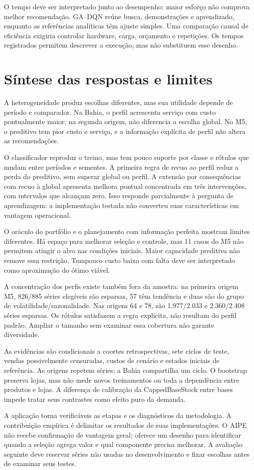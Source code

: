 O tempo deve ser interpretado junto ao desempenho: maior esforço não comprova melhor recomendação. GA--DQN reúne busca, demonstrações e aprendizado, enquanto as referências analíticas têm ajuste simples. Uma comparação causal de eficiência exigiria controlar hardware, carga, orçamento e repetições. Os tempos registrados permitem descrever a execução, mas não substituem esse desenho.


\section{Síntese das respostas e limites}
\label{sec:threats}\label{sec:resultados_m5}
A heterogeneidade produz escolhas diferentes, mas sua utilidade depende de período e comparador. Na Bahia, o perfil acrescenta serviço com custo pontualmente maior; na segunda origem, não diferencia a escolha global. No M5, o preditivo tem pior custo e serviço, e a informação explícita de perfil não altera as recomendações.

O classificador reproduz o treino, mas tem pouco suporte por classe e rótulos que mudam entre períodos e sementes. A primeira regra de recuo ao perfil reduz a perda do preditivo, sem superar global ou perfil. A extensão por consequências com recuo à global apresenta melhora pontual concentrada em três intervenções, com intervalos que alcançam zero. Isso responde parcialmente à pergunta de aprendizagem: a implementação testada não converteu suas características em vantagem operacional.

O oráculo do portfólio e o planejamento com informação perfeita mostram limites diferentes. Há espaço para melhorar seleção e controle, mas 11 casos do M5 não permitem atingir o alvo nas condições iniciais. Maior capacidade preditiva não remove essa restrição. Tampouco custo baixo com falta deve ser interpretado como aproximação do ótimo viável.

A concentração dos perfis existe também fora da amostra: na primeira origem M5, 826/885 séries elegíveis são esparsas, 57 têm tendência e duas são do grupo de volatilidade/sazonalidade. Nas origens 64 e 78, são 1.977/2.033 e 2.360/2.408 séries esparsas. Os rótulos satisfazem a regra explícita, não resultam do perfil padrão. Ampliar o tamanho sem examinar essa cobertura não garante diversidade.

As evidências são condicionais a coortes retrospectivas, sete ciclos de teste, vendas possivelmente censuradas, custos de cenário e estados iniciais de referência. As origens repetem séries; a Bahia compartilha um ciclo. O bootstrap preserva lojas, mas não mede novos treinamentos ou toda a dependência entre produtos e lojas. A diferença de calibração da CappedBaseStock entre bases impede tratar seus contrastes como efeito puro da demanda.

A aplicação torna verificáveis as etapas e os diagnósticos da metodologia. A contribuição empírica é delimitar os resultados de suas implementações. O AIPE não recebe confirmação de vantagem geral; oferece um desenho para identificar quando a seleção agrega valor e qual componente precisa melhorar. A avaliação seguinte deve reservar séries não usadas no desenvolvimento e fixar escolhas antes de examinar seus testes.
